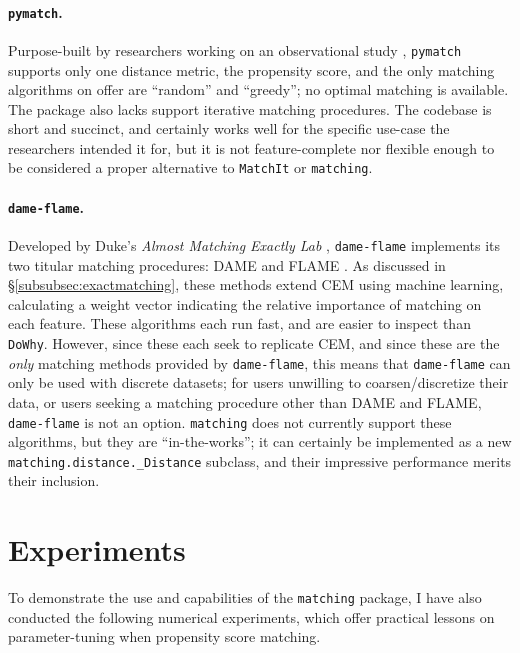 \documentclass[11pt]{extarticle}
\begin{document}
\paragraph{\texttt{pymatch}.} Purpose-built by researchers working on an observational study \parencite{miroglio_pymatch_2022}, \texttt{pymatch} supports only one distance metric, the propensity score, and the only matching algorithms on offer are ``random'' and ``greedy''; no optimal matching is available. 
The package also lacks support iterative matching procedures.
The codebase is short and succinct, and certainly works well for the specific use-case the researchers intended it for, but it is not feature-complete nor flexible enough to be considered a proper alternative to \texttt{MatchIt} or \texttt{matching}.

\paragraph{\texttt{dame-flame}.} Developed by Duke's \emph{Almost Matching Exactly Lab} \parencite{gupta_dame-flame_2021}, \texttt{dame-flame} implements its two titular matching procedures: DAME \parencite{liu_interpretable_2019} and FLAME \parencite{wang_flame_2021}. As discussed in \S\ref{subsubsec:exactmatching}, these methods extend CEM using machine learning, calculating a weight vector  indicating the relative importance of matching on each feature. These algorithms each run fast, and are easier to inspect than \texttt{DoWhy}. However, since these each seek to replicate CEM, and since these are the \emph{only} matching methods provided by \texttt{dame-flame}, this means that \texttt{dame-flame} can only be used with discrete datasets; for users unwilling to coarsen/discretize their data, or users seeking a matching procedure other than DAME and FLAME, \texttt{dame-flame} is not an option. \texttt{matching} does not currently support these algorithms, but they are ``in-the-works''; it can certainly be implemented as a new \texttt{matching.distance.\_Distance} subclass, and their impressive performance merits their inclusion.

\section{Experiments}
\label{sec:experiments}

To demonstrate the use and capabilities of the \texttt{matching} package, I have also conducted the following numerical experiments, which offer practical lessons on parameter-tuning when propensity score matching.
\end{document}
